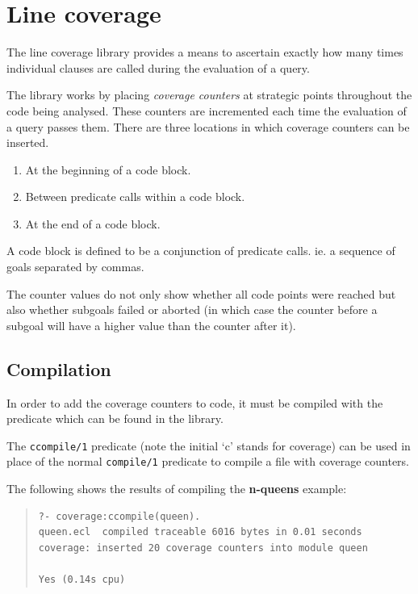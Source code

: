 \section{Line coverage}
The line coverage library provides a means to ascertain exactly how
many times individual clauses are called during the evaluation of a
query.

The library works by placing \emph{coverage counters} at strategic
points throughout the code being analysed.  These counters are
incremented each time the evaluation of a query passes them.  There
are three locations in which coverage counters can be inserted.
\begin{enumerate}
\item At the beginning of a code block.
\item Between predicate calls within a code block.
\item At the end of a code block.
\end{enumerate}
A code block is defined to be a conjunction of predicate calls. ie. a
sequence of goals separated by commas.

The counter values do not only show whether all code points were 
reached but also whether subgoals failed or aborted (in which case 
the counter before a subgoal will have a higher value than the 
counter after it).

\subsection{Compilation}
In order to add the coverage counters to code, it must be compiled with
the 
predicate which can be found in the 
 library.

The {\tt ccompile/1} predicate (note the initial `c' stands for
coverage) can be used in place of the normal {\tt compile/1}
predicate to compile a file with coverage counters.

The following shows the results of compiling the \textbf{n-queens} example:
\begin{quote}
\begin{verbatim}
?- coverage:ccompile(queen).
queen.ecl  compiled traceable 6016 bytes in 0.01 seconds
coverage: inserted 20 coverage counters into module queen 

Yes (0.14s cpu)
\end{verbatim}
\end{quote}

